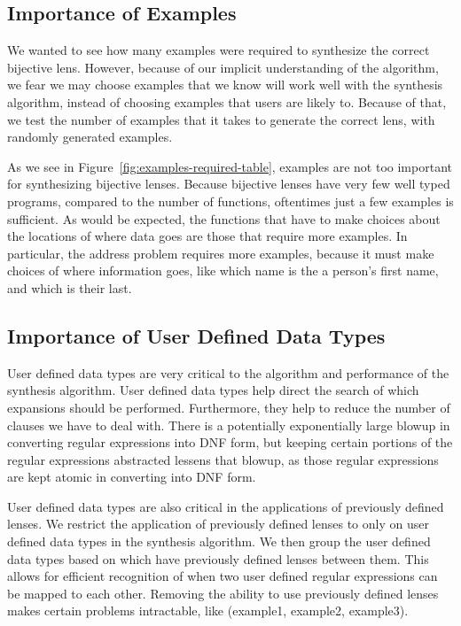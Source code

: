 \documentclass[numbers]{sigplanconf}
\begin{document}
\subsection{Importance of Examples}
We wanted to see how many examples were required to synthesize the correct
bijective lens.
However, because of our implicit understanding of the algorithm, we fear we may
choose examples that we know will work well with the synthesis algorithm,
instead of choosing examples that users are likely to.
Because of that, we test the number of examples that it takes to generate the
correct lens, with randomly generated examples.


As we see in Figure~\ref{fig:examples-required-table}, examples are not too
important for synthesizing bijective lenses.
Because bijective lenses have very few well typed programs, compared to the
number of functions, oftentimes just a few examples is sufficient.
As would be expected, the functions that have to make choices about the
locations of where data goes are those that require more examples.
In particular, the address problem requires more examples, because it must make
choices of where information goes, like which name is the a person's first name,
and which is their last.

\subsection{Importance of User Defined Data Types}

User defined data types are very critical to the algorithm and performance of
the synthesis algorithm.  User defined data types help direct the search of
which expansions should be performed.  Furthermore, they help to reduce the
number of clauses we have to deal with.  There is a potentially exponentially
large blowup in converting regular expressions into DNF form, but keeping
certain portions of the regular expressions abstracted lessens that blowup,
as those regular expressions are kept atomic in converting into DNF form.

User defined data types are also critical in the applications of previously
defined lenses.  We restrict the application of previously defined lenses to
only on user defined data types in the synthesis algorithm.  We then group the
user defined data types based on which have previously defined lenses between
them.  This allows for efficient recognition of when two user defined regular
expressions can be mapped to each other.  Removing the ability to use previously
defined lenses makes certain problems intractable, like (example1, example2,
example3).
\end{document}
